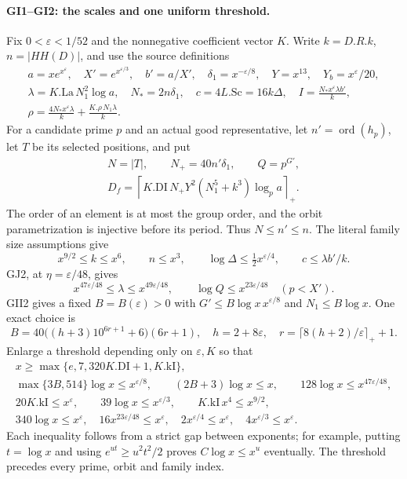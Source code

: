 \documentclass[11pt,a4paper]{article}
\numberwithin{equation}{section}
\theoremstyle{remark}\newtheorem{remark}[theorem]{Remark}
\begin{document}
\paragraph{GI1--GI2: the scales and one uniform threshold.}
Fix $0<\varepsilon<1/52$ and the nonnegative coefficient vector
$K$. Write $k=D.R.k$, $n=|HH(D)|$, and use the source definitions
\[
\begin{gathered}
 a=xe^{x^\varepsilon},\quad
 X'=e^{x^{\varepsilon/3}},\quad
 b'=a/X',\quad \delta_1=x^{-\varepsilon/8},\quad
 Y=x^{13},\quad Y_b=x^\varepsilon/20,\\
 \lambda=K.\mathrm{La}\,N_1^2\log a,\quad
 N_*=2n\delta_1,\quad
 c=4L.\mathrm{Sc}=16k\Delta,\quad
 I=\frac{N_*x^\varepsilon\lambda b'}k,\\
 \rho=\frac{4N_*x^\varepsilon\lambda}k
          +\frac{K.\rho\,N_1\lambda}k.
\end{gathered}                                                    \tag{GI.1}
\]
For a candidate prime $p$ and an actual good representative,
let $n'=\operatorname{ord}(h_p)$, let $T$ be its selected
positions, and put
\[
\begin{gathered}
 N=|T|,\qquad N_+=40n'\delta_1,\qquad Q=p^{G'},\\
 D_f=\left\lceil K.\mathrm{DI}\,N_+Y^2
                    (N_1^5+k^3)\log_p a\right\rceil_+.
\end{gathered}                                                    \tag{GI.2}
\]
The order of an element is at most the group order, and the
orbit parametrization is injective before its period. Thus
$N\le n'\le n$. The literal family size assumptions give
\[
 x^{9/2}\le k\le x^6,\qquad n\le x^3,\qquad
 \log\Delta\le\tfrac12x^{\varepsilon/4},\qquad
 c\le\lambda b'/k.                                      \tag{GI.3}
\]
GJ2, at $\eta=\varepsilon/48$, gives
\[
 x^{47\varepsilon/48}\le\lambda\le x^{49\varepsilon/48},
 \qquad \log Q\le x^{23\varepsilon/48}\quad(p<X').        \tag{GI.4}
\]
GII2 gives a fixed $B=B(\varepsilon)>0$ with
$G'\le B\log x\,x^{\varepsilon/8}$ and $N_1\le B\log x$.
One exact choice is
\[
 B=40\bigl((h+3)10^{6r+1}+6\bigr)(6r+1),\quad
 h=2+8\varepsilon,\quad
 r=\lceil8(h+2)/\varepsilon\rceil_++1.
\]
Enlarge a threshold depending only on $\varepsilon,K$ so that
\[
\begin{gathered}
 x\ge\max\{e,7,320K.\mathrm{DI}+1,K.\mathrm{kI}\},\\
 \max\{3B,514\}\log x\le x^{\varepsilon/8},\qquad
 (2B+3)\log x\le x,\qquad
 128\log x\le x^{47\varepsilon/48},\\
 20K.\mathrm{kI}\le x^\varepsilon,\qquad
 39\log x\le x^{\varepsilon/3},\qquad
 K.\mathrm{kI}\,x^4\le x^{9/2},\\
 340\log x\le x^\varepsilon,\quad
 16x^{23\varepsilon/48}\le x^\varepsilon,\quad
 2x^{\varepsilon/4}\le x^\varepsilon,\quad
 4x^{\varepsilon/3}\le x^\varepsilon.
\end{gathered}                                                    \tag{GI.5}
\]
Each inequality follows from a strict gap between exponents;
for example, putting $t=\log x$ and using
$e^{ut}\ge u^2t^2/2$ proves $C\log x\le x^u$ eventually.
The threshold precedes every prime, orbit and family index.
\end{document}
